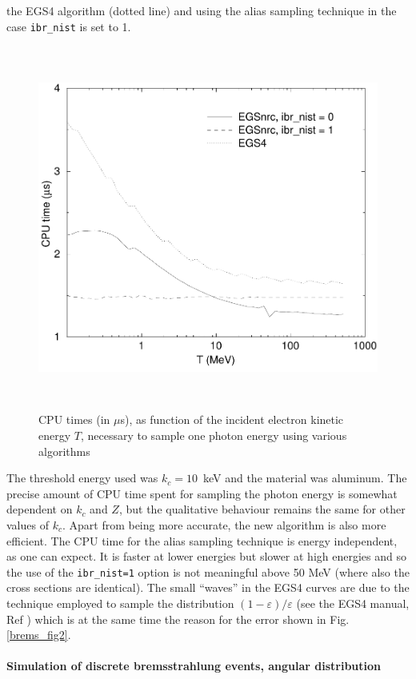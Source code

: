the EGS4 algorithm (dotted line) and using the alias sampling technique
in the case {\tt ibr\_nist} is set to 1.
\begin{figure}[htp]
\includegraphics[height=12cm,width=12cm]{figures/brem_times}
\caption[CPU times for bremsstrahlung sampling]{\label{brems_times}
CPU times (in $\mu$s), as function of the incident electron kinetic
energy $T$, necessary to sample one photon energy using various
algorithms}
\end{figure}
The threshold energy used was $k_c = 10$~keV and the material
was aluminum. The precise
amount of CPU time spent for sampling the photon energy
is somewhat dependent on $k_c$ and $Z$, but the qualitative
behaviour remains the same for other values of $k_c$.
Apart from being more accurate, the new algorithm is also more
efficient. The CPU time for the alias sampling technique is
energy independent, as one can expect. It is faster at lower
energies but slower at high energies and so the use
of the {\tt ibr\_nist=1} option is not meaningful above 50 MeV
(where also the cross sections are identical). The small
``waves'' in the EGS4 curves are due to the technique employed
to sample the distribution $(1-\varepsilon)/\varepsilon$
(see the EGS4 manual, Ref \cite{Ne85}) which is at the same time
the reason for the error shown in Fig. \ref{brems_fig2}.

\paragraph{Simulation of discrete bremsstrahlung events,
angular distribution}
\hfill
{}

